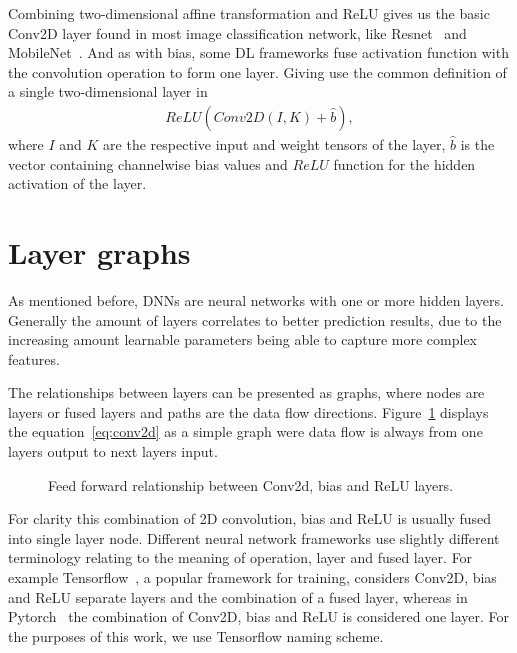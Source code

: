 \documentclass[12pt,a4paper,english
]{tunithesis}
\begin{document}
Combining two-dimensional affine transformation and ReLU gives us the basic Conv2D layer found in most image classification network, like Resnet~\parencite{he2015deepresiduallearningimage} and MobileNet~\parencite{howard2017mobilenetsefficientconvolutionalneural}.
And as with bias, some DL frameworks fuse activation function with the convolution operation to form one layer. Giving use the common definition of a single two-dimensional layer in
\begin{align}
ReLU(Conv2D(I, K) + \hat{b}),
\label{eq:conv2d}
\end{align}
where $I$ and $K$ are the respective input and weight tensors of the layer,  $\hat{b}$ is the vector containing channelwise bias values and $ReLU$ function for the hidden activation of the layer.

\section{Layer graphs}
As mentioned before, DNNs are neural networks with one or more hidden layers. Generally the amount of layers correlates to better prediction results, due to the increasing amount learnable parameters being able to capture more complex features.

The relationships between layers can be presented as graphs, where nodes are layers or fused layers and paths are the data flow directions. Figure~\ref{fig:conv2d-layer} displays the equation~\ref{eq:conv2d} as a simple graph were data flow is always from one layers output to next layers input.

\begin{figure}[ht]
\centering
{}
\caption{Feed forward relationship between Conv2d, bias and ReLU layers.}
\label{fig:conv2d-layer}
\end{figure}
For clarity this combination of 2D convolution, bias and ReLU is usually fused into single layer node. Different neural network frameworks use slightly different terminology relating to the meaning of operation, layer and fused layer. For example Tensorflow~\parencite{tensorflow2015-whitepaper}, a popular framework for training, considers Conv2D, bias and ReLU separate layers and the combination of a fused layer, whereas in Pytorch~\cite{pytorch} the combination of Conv2D, bias and ReLU is considered one layer. For the purposes of this work, we use Tensorflow naming scheme.
\end{document}
